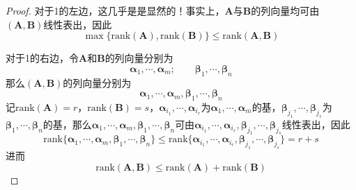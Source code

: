 \documentclass[lang = cn, scheme = chinese, thmcnt = section]{elegantbook}
\newcommand{\bs}{\boldsymbol}          %
\newcommand{\rank}{\text{rank}}        %
\begin{document}
\begin{proof}
	对于1的左边，这几乎是是显然的！事实上，$\bs{A}$与$\bs{B}$的列向量均可由$(\bs{A},\bs{B})$线性表出，因此%
	$$
	\max\{ \rank(\bs{A}),\rank(\bs{B}) \}
	\le \rank(\bs{A} , \bs{B})
	$$
	
	对于1的右边，令$\bs{A}$和$\bs{B}$的列向量分别为
	$$
	\bs{\alpha}_1,\cdots,\bs{\alpha}_m;\qquad 
	\bs{\beta}_1,\cdots,\bs{\beta}_n
	$$
	那么$(\bs{A},\bs{B})$的列向量分别为
	$$
	\bs{\alpha}_1,\cdots,\bs{\alpha}_m,
	\bs{\beta}_1,\cdots,\bs{\beta}_n
	$$
	记$\rank(\bs{A})=r$，$\rank(\bs{B})=s$，$\bs{\alpha}_{i_1},\cdots,\bs{\alpha}_{i_r}$为$\bs{\alpha}_1,\cdots,\bs{\alpha}_m$的基，$\bs{\beta}_{j_1},\cdots,\bs{\beta}_{j_s}$为$\bs{\beta}_1,\cdots,\bs{\beta}_n$的基，那么$\bs{\alpha}_1,\cdots,\bs{\alpha}_m,
	\bs{\beta}_1,\cdots,\bs{\beta}_n$可由$\bs{\alpha}_{i_1},\cdots,\bs{\alpha}_{i_r},\bs{\beta}_{j_1},\cdots,\bs{\beta}_{j_s}$线性表出，因此%
	$$
	\rank\{ \bs{\alpha}_1,\cdots,\bs{\alpha}_m,
	\bs{\beta}_1,\cdots,\bs{\beta}_n \}
	\le\rank\{ \bs{\alpha}_{i_1},\cdots,\bs{\alpha}_{i_r},\bs{\beta}_{j_1},\cdots,\bs{\beta}_{j_s} \}
	=r+s
	$$
	进而
	$$
	\rank(\bs{A} , \bs{B})
	\le \rank(\bs{A})+\rank(\bs{B})
	$$
	

\end{proof}
\end{document}
